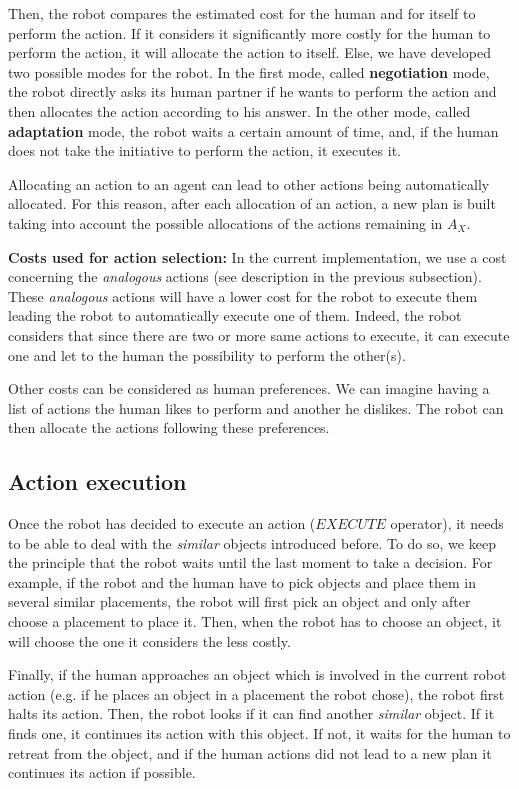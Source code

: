 \documentclass[english,a4paper,11pt,twoside]{StyleThese}
\begin{document}
Then, the robot compares the estimated cost for the human and for itself to perform the action. If it considers it significantly more costly for the human to perform the action, it will allocate the action to itself. Else, we have developed two possible modes for the robot. In the first mode, called \textbf{negotiation} mode, the robot directly asks its human partner if he wants to perform the action and then allocates the action according to his answer. In the other mode, called \textbf{adaptation} mode, the robot waits a certain amount of time, and, if the human does not take the initiative to perform the action, it executes it. 

Allocating an action to an agent can lead to other actions being automatically allocated. For this reason, after each allocation of an action, a new plan is built taking into account the possible allocations of the actions remaining in $A_X$.

\textbf{Costs used for action selection:}
In the current implementation, we use a cost concerning the \textit{analogous} actions (see description in the previous subsection). These \textit{analogous} actions will have a lower cost for the robot to execute them leading the robot to automatically execute one of them. Indeed, the robot considers that since there are two or more same actions to execute, it can execute one and let to the human the possibility to perform the other(s).

Other costs can be considered as human preferences. We can imagine having a list of actions the human likes to perform and another he dislikes. The robot can then allocate the actions following these preferences.

\subsection{Action execution}
\label{subsec:execution}

Once the robot has decided to execute an action ($EXECUTE$ operator), it needs to be able to deal with the \textit{similar} objects introduced before. To do so, we keep the principle that the robot waits until the last moment to take a decision. For example, if the robot and the human have to pick objects and place them in several similar placements, the robot will first pick an object and only after choose a placement to place it. Then, when the robot has to choose an object, it will choose the one it considers the less costly.

Finally, if the human approaches an object which is involved in the current robot action (e.g. if he places an object in a placement the robot chose), the robot first halts its action. Then, the robot looks if it can find another \textit{similar} object. If it finds one, it continues its action with this object. If not, it waits for the human to retreat from the object, and if the human actions did not lead to a new plan it continues its action if possible.
\end{document}
